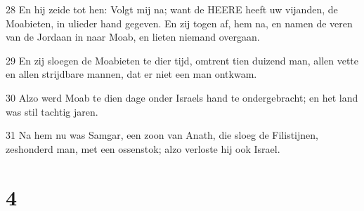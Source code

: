 \par 28 En hij zeide tot hen: Volgt mij na; want de HEERE heeft uw vijanden, de Moabieten, in ulieder hand gegeven. En zij togen af, hem na, en namen de veren van de Jordaan in naar Moab, en lieten niemand overgaan.
\par 29 En zij sloegen de Moabieten te dier tijd, omtrent tien duizend man, allen vette en allen strijdbare mannen, dat er niet een man ontkwam.
\par 30 Alzo werd Moab te dien dage onder Israels hand te ondergebracht; en het land was stil tachtig jaren.
\par 31 Na hem nu was Samgar, een zoon van Anath, die sloeg de Filistijnen, zeshonderd man, met een ossenstok; alzo verloste hij ook Israel.

\chapter{4}

